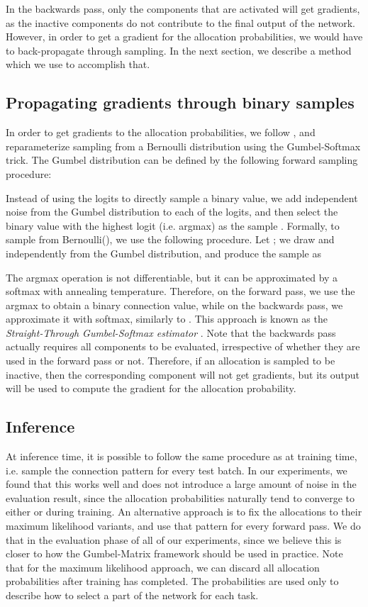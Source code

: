 \documentclass[conference]{IEEEtran}
\begin{document}
In the backwards pass, only the components that are activated will get gradients, as the inactive components do not contribute to the final output of the network. However, in order to get a gradient for the allocation probabilities, we would have to back-propagate through sampling. In the next section, we describe a method which we use to accomplish that.

\subsection{Propagating gradients through binary samples}
In order to get gradients to the allocation probabilities, we follow \cite{JangGuPoole.2017}, and reparameterize sampling from a Bernoulli distribution using the Gumbel-Softmax trick.
The Gumbel distribution can be defined by the following forward sampling procedure:

Instead of using the logits to directly sample a binary value, we add independent noise from the Gumbel distribution to each of the logits, and then select the binary value with the highest logit (i.e. argmax) as the sample . Formally, to sample from Bernoulli(), we use the following procedure. Let ; we draw  and  independently from the Gumbel distribution, and produce the sample  as

The argmax operation is not differentiable, but it can be approximated by a softmax with annealing temperature. Therefore, on the forward pass, we use the argmax to obtain a binary connection value, while on the backwards pass, we approximate it with softmax, similarly to \cite{SpotTune-CVPR-2018}. This approach is known as the \textit{Straight-Through Gumbel-Softmax estimator} \cite{JangGuPoole.2017}.
Note that the backwards pass actually requires all components to be evaluated, irrespective of whether they are used in the forward pass or not. Therefore, if an allocation is sampled to be inactive, then the corresponding component will not get gradients, but its output will be used to compute the gradient for the allocation probability.

\subsection{Inference}

At inference time, it is possible to follow the same procedure as at training time, i.e. sample the connection pattern for every test batch. In our experiments, we found that this works well and does not introduce a large amount of noise in the evaluation result, since the allocation probabilities naturally tend to converge to either  or  during training. An alternative approach is to fix the allocations to their maximum likelihood variants, and use that pattern for every forward pass. We do that in the evaluation phase of all of our experiments, since we believe this is closer to how the Gumbel-Matrix framework should be used in practice. Note that for the maximum likelihood approach, we can discard all allocation probabilities after training has completed. The probabilities are used only to describe how to select a part of the network for each task.
\end{document}
